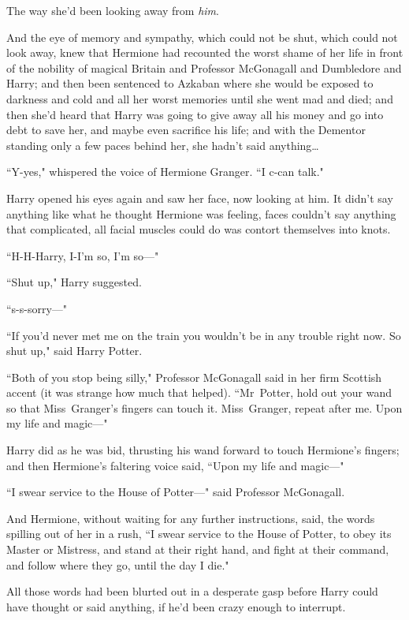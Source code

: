 The way she'd been looking away from \emph{him}.

And the eye of memory and sympathy, which could not be shut, which could not look away, knew that Hermione had recounted the worst shame of her life in front of the nobility of magical Britain and Professor McGonagall and Dumbledore and Harry; and then been sentenced to Azkaban where she would be exposed to darkness and cold and all her worst memories until she went mad and died; and then she'd heard that Harry was going to give away all his money and go into debt to save her, and maybe even sacrifice his life; and with the Dementor standing only a few paces behind her, she hadn't said anything{\ldots}

``Y-yes," whispered the voice of Hermione Granger. ``I c-can talk."

Harry opened his eyes again and saw her face, now looking at him. It didn't say anything like what he thought Hermione was feeling, faces couldn't say anything that complicated, all facial muscles could do was contort themselves into knots.

``H-H-Harry, I-I'm so, I'm so—"

``Shut up," Harry suggested.

``s-s-sorry—"

``If you'd never met me on the train you wouldn't be in any trouble right now. So shut up," said Harry Potter.

``Both of you stop being silly," Professor McGonagall said in her firm Scottish accent (it was strange how much that helped). ``Mr~Potter, hold out your wand so that Miss~Granger's fingers can touch it. Miss~Granger, repeat after me. Upon my life and magic—"

Harry did as he was bid, thrusting his wand forward to touch Hermione's fingers; and then Hermione's faltering voice said, ``Upon my life and magic—"

``I swear service to the House of Potter—" said Professor McGonagall.

And Hermione, without waiting for any further instructions, said, the words spilling out of her in a rush, ``I swear service to the House of Potter, to obey its Master or Mistress, and stand at their right hand, and fight at their command, and follow where they go, until the day I die."

All those words had been blurted out in a desperate gasp before Harry could have thought or said anything, if he'd been crazy enough to interrupt.

